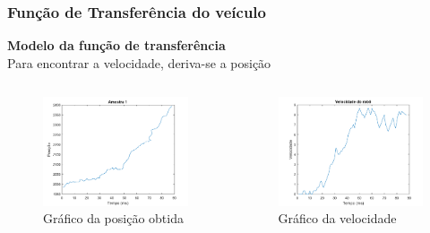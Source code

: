 \begin{frame}
\frametitle{Função de Transferência do veículo}
\textbf{Modelo da função de transferência}\\
	Para encontrar a velocidade, deriva-se a posição
	
\begin{columns}

	\begin{figure}[th]
	\centering
	\captionsetup{width=\textwidth,font=footnotesize,textfont=bf}
	\includegraphics[width=\linewidth,keepaspectratio]{Figuras/Posicao3v2.pdf}
	\caption{Gráfico da posição obtida}				
	\end{figure}
 	
	\begin{figure}[th]
	\centering
	\captionsetup{width=\textwidth,font=footnotesize,textfont=bf}
	\includegraphics[width=\linewidth,keepaspectratio]{Figuras/Derivadav2.pdf}
	\caption{Gráfico da velocidade}				
	\end{figure}
\end{columns}
\end{frame}



